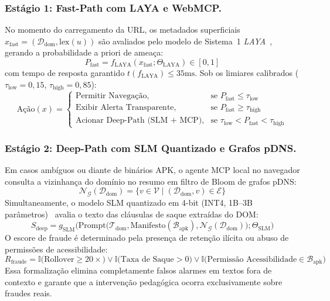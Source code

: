 \subsubsection{Est\'{a}gio 1: Fast-Path com LAYA e WebMCP.}
No momento do carregamento da URL, os metadados superficiais $x_{\text{fast}} = (\mathcal{D}_{\text{dom}}, \text{lex}(u))$ s\~{a}o avaliados pelo modelo de Sistema~1 \textit{LAYA}~\cite{convai2026laya}, gerando a probabilidade a priori de amea\c{c}a:
\begin{equation}
    P_{\text{fast}} = f_{\text{LAYA}}(x_{\text{fast}}; \Theta_{\text{LAYA}}) \in [0, 1]
\end{equation}
com tempo de resposta garantido $t(f_{\text{LAYA}}) \le 35\text{ms}$. Sob os limiares calibrados ($\tau_{\text{low}} = 0{,}15$, $\tau_{\text{high}} = 0{,}85$):
\begin{equation}
    \text{A\c{c}\~{a}o}(x) = 
    \begin{cases}
        \text{Permitir Navega\c{c}\~{a}o}, & \text{se } P_{\text{fast}} \le \tau_{\text{low}} \\
        \text{Exibir Alerta Transparente}, & \text{se } P_{\text{fast}} \ge \tau_{\text{high}} \\
        \text{Acionar Deep-Path (SLM + MCP)}, & \text{se } \tau_{\text{low}} < P_{\text{fast}} < \tau_{\text{high}}
    \end{cases}
\end{equation}

\subsubsection{Est\'{a}gio 2: Deep-Path com SLM Quantizado e Grafos pDNS.}
Em casos amb\'{i}guos ou diante de bin\'{a}rios APK, o agente MCP local no navegador consulta a vizinhan\c{c}a do dom\'{i}nio no resumo em filtro de Bloom de grafos pDNS:
\begin{equation}
    \mathcal{N}_{\mathcal{G}}(\mathcal{D}_{\text{dom}}) = \big\{v \in \mathcal{V} \mid (\mathcal{D}_{\text{dom}}, v) \in \mathcal{E}\big\}
\end{equation}
Simultaneamente, o modelo SLM quantizado em 4-bit (INT4, 1B--3B par\^{a}metros)~\cite{liu2024mobilellm} avalia o texto das cl\'{a}usulas de saque extra\'{i}das do DOM:
\begin{equation}
    S_{\text{deep}} = g_{\text{SLM}}\Big(\text{Prompt}\big(\mathcal{T}_{\text{dom}}, \text{Manifesto}(\mathcal{B}_{\text{apk}}), \mathcal{N}_{\mathcal{G}}(\mathcal{D}_{\text{dom}})\big); \Theta_{\text{SLM}}\Big)
\end{equation}
O escore de fraude \'{e} determinado pela presen\c{c}a de reten\c{c}\~{a}o il\'{i}cita ou abuso de permiss\~{o}es de acessibilidade:
\begin{equation}
    R_{\text{fraude}} = \mathbb{I}\big(\text{Rollover} \ge 20\times\big) \lor \mathbb{I}\big(\text{Taxa de Saque} > 0\big) \lor \mathbb{I}\big(\text{Permiss\~{a}o Acessibilidade} \in \mathcal{B}_{\text{apk}}\big)
\end{equation}
Essa formaliza\c{c}\~{a}o elimina completamente falsos alarmes em textos fora de contexto e garante que a interven\c{c}\~{a}o pedag\'{o}gica ocorra exclusivamente sobre fraudes reais.